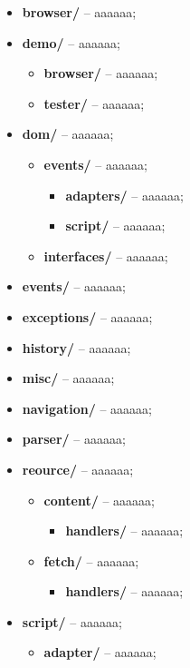 \begin{itemize}
  \item[] \textbf{browser/} -- aaaaaa;
  \item[] \textbf{demo/} -- aaaaaa;
     \begin{itemize}
       \item[] \textbf{browser/} -- aaaaaa;
       \item[] \textbf{tester/} -- aaaaaa;
     \end{itemize}
  \item[] \textbf{dom/} -- aaaaaa;
     \begin{itemize}
       \item[] \textbf{events/} -- aaaaaa;
         \begin{itemize}
           \item[] \textbf{adapters/} -- aaaaaa;
           \item[] \textbf{script/} -- aaaaaa;
         \end{itemize}
       \item[] \textbf{interfaces/} -- aaaaaa;
     \end{itemize}
  \item[] \textbf{events/} -- aaaaaa;
  \item[] \textbf{exceptions/} -- aaaaaa;
  \item[] \textbf{history/} -- aaaaaa;
  \item[] \textbf{misc/} -- aaaaaa;
  \item[] \textbf{navigation/} -- aaaaaa;
  \item[] \textbf{parser/} -- aaaaaa;
  \item[] \textbf{reource/} -- aaaaaa;
     \begin{itemize}
       \item[] \textbf{content/} -- aaaaaa;
         \begin{itemize}
           \item[] \textbf{handlers/} -- aaaaaa;
         \end{itemize}
       \item[] \textbf{fetch/} -- aaaaaa;
         \begin{itemize}
           \item[] \textbf{handlers/} -- aaaaaa;
         \end{itemize}
     \end{itemize}
  \item[] \textbf{script/} -- aaaaaa;
     \begin{itemize}
       \item[] \textbf{adapter/} -- aaaaaa;

\end{itemize}
\end{itemize}

